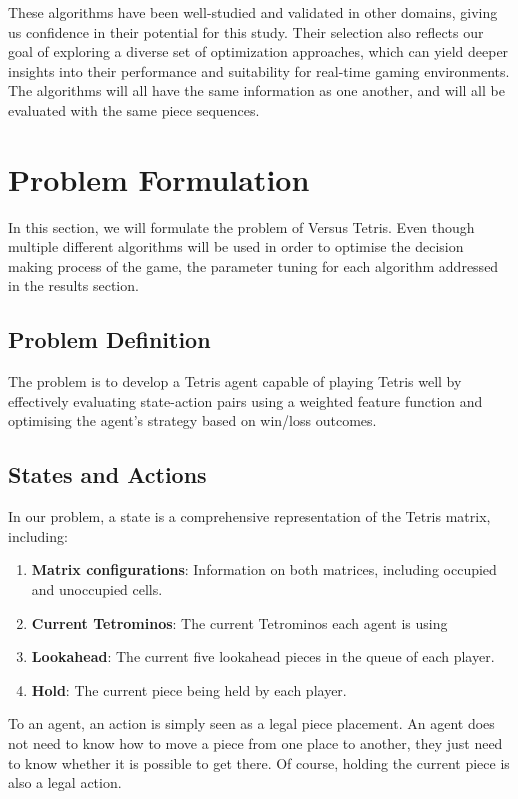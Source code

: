 \documentclass[a4paper, 12pt]{extreport}
\begin{document}
	These algorithms have been well-studied and validated in other domains, giving us confidence in their potential for this study. Their selection also reflects our goal of exploring a diverse set of optimization approaches, which can yield deeper insights into their performance and suitability for real-time gaming environments. The algorithms will all have the same information as one another, and will all be evaluated with the same piece sequences.
	
	\section{Problem Formulation}\label{sec:problem-formulation}
	
	In this section, we will formulate the problem of Versus Tetris. Even though multiple different algorithms will be used in order to optimise the decision making process of the game, the parameter tuning for each algorithm addressed in the results section.
	
	\subsection{Problem Definition}
	
	The problem is to develop a Tetris agent capable of playing Tetris well by effectively evaluating state-action pairs using a weighted feature function and optimising the agent's strategy based on win/loss outcomes.
	
	\subsection{States and Actions}
	
	In our problem, a state is a comprehensive representation of the Tetris matrix, including:
	
	\begin{enumerate}
		\item \textbf{Matrix configurations}: Information on both matrices, including occupied and unoccupied cells.
		\item \textbf{Current Tetrominos}: The current Tetrominos each agent is using
		\item \textbf{Lookahead}: The current five lookahead pieces in the queue of each player.
		\item \textbf{Hold}: The current piece being held by each player.
	\end{enumerate}
	
	To an agent, an action is simply seen as a legal piece placement. An agent does not need to know how to move a piece from one place to another, they just need to know whether it is possible to get there. Of course, holding the current piece is also a legal action.
	
\end{document}
